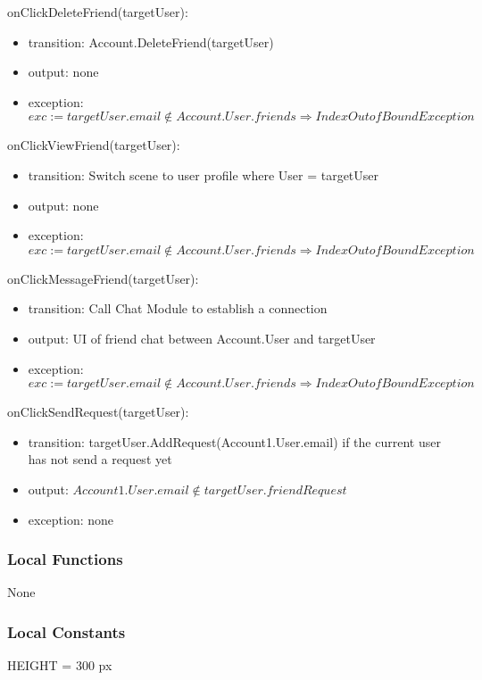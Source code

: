 \documentclass[12pt, titlepage]{article}
\begin{document}
\noindent onClickDeleteFriend(targetUser):
\begin{itemize}
\item transition: Account.DeleteFriend(targetUser)
\item output: none
\item exception: $exc := targetUser.email \notin Account.User.friends \Rightarrow IndexOutofBound Exception$
\end{itemize}

\noindent onClickViewFriend(targetUser):
\begin{itemize}
\item transition: Switch scene to user profile where User = targetUser
\item output: none
\item exception: $exc := targetUser.email \notin Account.User.friends \Rightarrow IndexOutofBound Exception$
\end{itemize}

\noindent onClickMessageFriend(targetUser):
\begin{itemize}
\item transition: Call Chat Module to establish a connection
\item output: UI of friend chat between Account.User and targetUser
\item exception: $exc := targetUser.email \notin Account.User.friends \Rightarrow IndexOutofBound Exception$
\end{itemize}

\noindent onClickSendRequest(targetUser):
\begin{itemize}
\item transition: targetUser.AddRequest(Account1.User.email) if the current user has not send a request yet
\item output: $Account1.User.email \notin targetUser.friendRequest$
\item exception: none
\end{itemize}

\subsubsection{Local Functions}

None

\subsubsection{Local Constants}
HEIGHT = 300 px

\newpage
\end{document}
